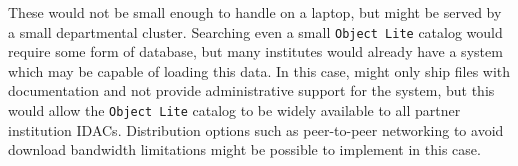 These would not be small enough to handle on a laptop, but might be served by a small departmental cluster.
Searching even a small {\tt \gls{Object} Lite} catalog would require some form of database, but many institutes would already have a system which may be capable of loading this data.
In this case, \RO might only ship files with documentation and not provide administrative support for the system, but this would allow the {\tt \gls{Object} Lite} catalog to be widely available to all partner institution IDACs. Distribution options such as peer-to-peer networking to avoid download bandwidth limitations might be possible to implement in this case.

